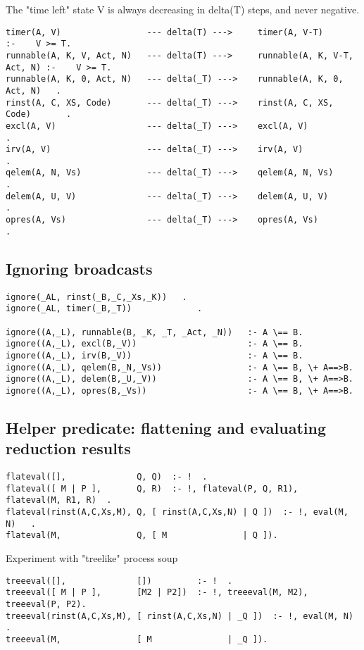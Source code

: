 The "time left" state V is always decreasing in delta(T) steps, and never negative.
\begin{verbatim}
timer(A, V)                 --- delta(T) --->     timer(A, V-T)               :-    V >= T.
runnable(A, K, V, Act, N)   --- delta(T) --->     runnable(A, K, V-T, Act, N) :-    V >= T.
runnable(A, K, 0, Act, N)   --- delta(_T) --->    runnable(A, K, 0, Act, N)   .
rinst(A, C, XS, Code)       --- delta(_T) --->    rinst(A, C, XS, Code)       .
excl(A, V)                  --- delta(_T) --->    excl(A, V)                  .
irv(A, V)                   --- delta(_T) --->    irv(A, V)                  .
qelem(A, N, Vs)             --- delta(_T) --->    qelem(A, N, Vs)            .
delem(A, U, V)              --- delta(_T) --->    delem(A, U, V)             .
opres(A, Vs)                --- delta(_T) --->    opres(A, Vs)               .
\end{verbatim}


\subsection{Ignoring broadcasts}

\begin{verbatim}
ignore(_AL, rinst(_B,_C,_Xs,_K))   .
ignore(_AL, timer(_B,_T))             .

ignore((A,_L), runnable(B, _K, _T, _Act, _N))   :- A \== B.
ignore((A,_L), excl(B,_V))                      :- A \== B.
ignore((A,_L), irv(B,_V))                       :- A \== B.
ignore((A,_L), qelem(B,_N,_Vs))                 :- A \== B, \+ A==>B.
ignore((A,_L), delem(B,_U,_V))                  :- A \== B, \+ A==>B.
ignore((A,_L), opres(B,_Vs))                    :- A \== B, \+ A==>B.
\end{verbatim}


\subsection{Helper predicate: flattening and evaluating reduction results}

\begin{verbatim}
flateval([],              Q, Q)  :- !  .
flateval([ M | P ],       Q, R)  :- !, flateval(P, Q, R1),  flateval(M, R1, R)  .
flateval(rinst(A,C,Xs,M), Q, [ rinst(A,C,Xs,N) | Q ])  :- !, eval(M, N)   .
flateval(M,               Q, [ M               | Q ]).
\end{verbatim}

Experiment with "treelike" process soup
\begin{verbatim}
treeeval([],              [])         :- !  .
treeeval([ M | P ],       [M2 | P2])  :- !, treeeval(M, M2), treeeval(P, P2).
treeeval(rinst(A,C,Xs,M), [ rinst(A,C,Xs,N) | _Q ])  :- !, eval(M, N)   .
treeeval(M,               [ M               | _Q ]).
\end{verbatim}

